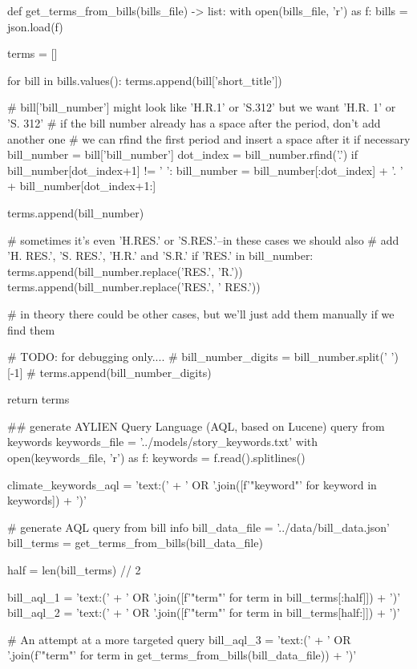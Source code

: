 \begin{pyin}
def get_terms_from_bills(bills_file) -> list:
    with open(bills_file, 'r') as f:
        bills = json.load(f)

    terms = []

    for bill in bills.values():
        terms.append(bill['short_title'])

        # bill['bill_number'] might look like 'H.R.1' or 'S.312' but we want 'H.R. 1' or 'S. 312'
        # if the bill number already has a space after the period, don't add another one
        # we can rfind the first period and insert a space after it if necessary
        bill_number = bill['bill_number']
        dot_index = bill_number.rfind('.')
        if bill_number[dot_index+1] != ' ':
            bill_number = bill_number[:dot_index] + '. ' + bill_number[dot_index+1:]

        terms.append(bill_number)

        # sometimes it's even 'H.RES.' or 'S.RES.'--in these cases we should also
        # add 'H. RES.', 'S. RES.', 'H.R.' and 'S.R.'
        if 'RES.' in bill_number:
            terms.append(bill_number.replace('RES.', 'R.'))
            terms.append(bill_number.replace('RES.', ' RES.'))

        # in theory there could be other cases, but we'll just add them manually if we find them

        # TODO: for debugging only....
        # bill_number_digits = bill_number.split(' ')[-1]
        # terms.append(bill_number_digits)

    return terms
\end{pyin}

\begin{pyin}
\## generate AYLIEN Query Language (AQL, based on Lucene) query from keywords
keywords_file = '../models/story_keywords.txt'
with open(keywords_file, 'r') as f:
    keywords = f.read().splitlines()

climate_keywords_aql = 'text:(' + ' OR '.join([f'"{keyword}"' for keyword in keywords]) + ')'

# generate AQL query from bill info
bill_data_file = '../data/bill_data.json'
bill_terms = get_terms_from_bills(bill_data_file)

half = len(bill_terms) // 2

bill_aql_1 = 'text:(' + ' OR '.join([f'"{term}"' for term in bill_terms[:half]]) + ')'
bill_aql_2 = 'text:(' + ' OR '.join([f'"{term}"' for term in bill_terms[half:]]) + ')'

# An attempt at a more targeted query
bill_aql_3 = 'text:(' + ' OR '.join(f'"{term}"' for term in get_terms_from_bills(bill_data_file)) + ')'
\end{pyin}

